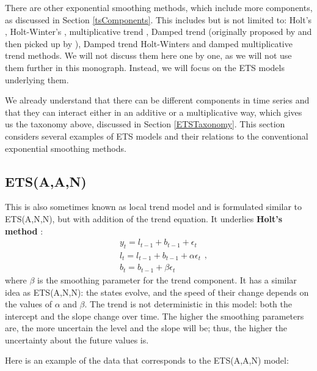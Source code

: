 \documentclass[]{book}
\theoremstyle{definition}
\theoremstyle{definition}
\theoremstyle{definition}
\theoremstyle{definition}
\theoremstyle{remark}
\begin{document}
There are other exponential smoothing methods, which include more components, as discussed in Section \ref{tsComponents}. This includes but is not limited to: Holt's \citep[originally proposed in 1957]{Holt2004b}, Holt-Winter's \citep{Winters1960}, multiplicative trend \citep{Pegels1969}, Damped trend (originally proposed by \citet{Roberts1982} and then picked up by \citet{Gardner1985a}), Damped trend Holt-Winters \citep{Gardner1989} and damped multiplicative trend \citep{Taylor2003} methods. We will not discuss them here one by one, as we will not use them further in this monograph. Instead, we will focus on the ETS models underlying them.

We already understand that there can be different components in time series and that they can interact either in an additive or a multiplicative way, which gives us the taxonomy above, discussed in Section \ref{ETSTaxonomy}. This section considers several examples of ETS models and their relations to the conventional exponential smoothing methods.

\hypertarget{ETSAAN}{%
\subsection{ETS(A,A,N)}\label{ETSAAN}}

This is also sometimes known as local trend model and is formulated similar to ETS(A,N,N), but with addition of the trend equation. It underlies \textbf{Holt's method} \citep{Ord1997}:
\begin{equation}
  \begin{aligned}
    & y_{t} = l_{t-1} + b_{t-1} + \epsilon_t \\
    & l_t = l_{t-1} + b_{t-1} + \alpha \epsilon_t \\
    & b_t = b_{t-1} + \beta \epsilon_t
  \end{aligned} ,
  \label{eq:ETSAAN}
\end{equation}
where \(\beta\) is the smoothing parameter for the trend component. It has a similar idea as ETS(A,N,N): the states evolve, and the speed of their change depends on the values of \(\alpha\) and \(\beta\). The trend is not deterministic in this model: both the intercept and the slope change over time. The higher the smoothing parameters are, the more uncertain the level and the slope will be; thus, the higher the uncertainty about the future values is.

Here is an example of the data that corresponds to the ETS(A,A,N) model:
\end{document}
